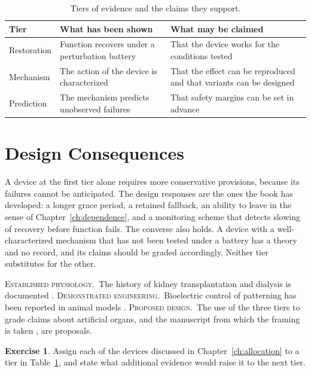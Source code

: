\documentclass[11pt,openany]{book}
\theoremstyle{definition}
\newtheorem{exercise}{Exercise}[chapter]
\theoremstyle{remark}
\newcommand{\est}{\textsc{Established physiology.}\ }
\newcommand{\dem}{\textsc{Demonstrated engineering.}\ }
\newcommand{\pro}{\textsc{Proposed design.}\ }
\begin{document}
\begin{table}[ht]
\centering
\caption{Tiers of evidence and the claims they support.}
\label{tab:tiers}
\small
\begin{tabular}{@{}p{2.6cm}p{4.2cm}p{4.8cm}@{}}
\toprule
Tier & What has been shown & What may be claimed \\
\midrule
Restoration & Function recovers under a perturbation battery & That the device works for the conditions tested \\
Mechanism & The action of the device is characterized & That the effect can be reproduced and that variants can be designed \\
Prediction & The mechanism predicts unobserved failures & That safety margins can be set in advance \\
\bottomrule
\end{tabular}
\end{table}

\section{Design Consequences}

A device at the first tier alone requires more conservative provisions, because its failures cannot be anticipated. The design responses are the ones the book has developed: a longer grace period, a retained fallback, an ability to leave in the sense of Chapter~\ref{ch:dependence}, and a monitoring scheme that detects slowing of recovery before function fails. The converse also holds. A device with a well-characterized mechanism that has not been tested under a battery has a theory and no record, and its claims should be graded accordingly. Neither tier substitutes for the other.

\begin{evidence}
\est The history of kidney transplantation and dialysis is documented \cite{merrill1956}. \dem Bioelectric control of patterning has been reported in animal models \cite{levin2021}. \pro The use of the three tiers to grade claims about artificial organs, and the manuscript from which the framing is taken \cite{flyxion2026restoration}, are proposals.
\end{evidence}

\begin{exercise}
Assign each of the devices discussed in Chapter~\ref{ch:allocation} to a tier in Table~\ref{tab:tiers}, and state what additional evidence would raise it to the next tier.
\end{exercise}
\end{document}
